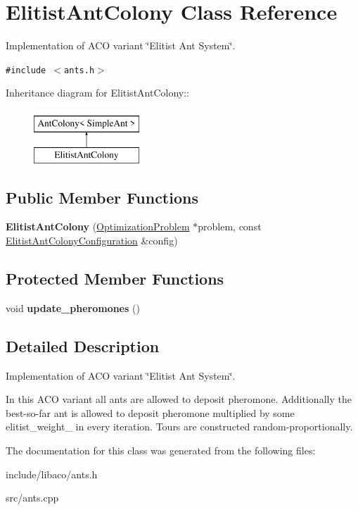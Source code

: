 \hypertarget{classElitistAntColony}{
\section{ElitistAntColony Class Reference}
\label{classElitistAntColony}
}
Implementation of ACO variant \char`\"{}Elitist Ant System\char`\"{}.  


{\tt \#include $<$ants.h$>$}

Inheritance diagram for ElitistAntColony::\begin{figure}[H]
\begin{center}
\leavevmode
\includegraphics[height=2cm]{classElitistAntColony}
\end{center}
\end{figure}
\subsection*{Public Member Functions}
\begin{CompactItemize}
\item 
\hypertarget{classElitistAntColony_a8008109e818918c7448f0475de41347}{
\textbf{ElitistAntColony} (\hyperlink{classOptimizationProblem}{OptimizationProblem} $\ast$problem, const \hyperlink{classElitistAntColonyConfiguration}{ElitistAntColonyConfiguration} \&config)}
\label{classElitistAntColony_a8008109e818918c7448f0475de41347}

\end{CompactItemize}
\subsection*{Protected Member Functions}
\begin{CompactItemize}
\item 
\hypertarget{classElitistAntColony_867bb9f89c8935aa3e6f2ca3959a2190}{
void \textbf{update\_\-pheromones} ()}
\label{classElitistAntColony_867bb9f89c8935aa3e6f2ca3959a2190}

\end{CompactItemize}


\subsection{Detailed Description}
Implementation of ACO variant \char`\"{}Elitist Ant System\char`\"{}. 

In this ACO variant all ants are allowed to deposit pheromone. Additionally the best-so-far ant is allowed to deposit pheromone multiplied by some elitist\_\-weight\_\- in every iteration. Tours are constructed random-proportionally. 

The documentation for this class was generated from the following files:\begin{CompactItemize}
\item 
include/libaco/ants.h\item 
src/ants.cpp\end{CompactItemize}
